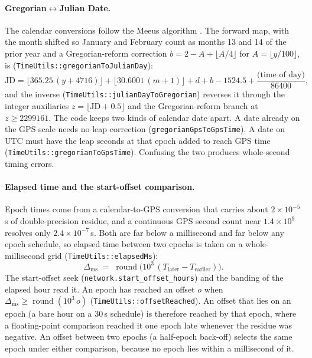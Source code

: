 \documentclass[main.tex]{subfiles}
\begin{document}
\paragraph{Gregorian$\leftrightarrow$Julian Date.}
The calendar conversions follow the Meeus algorithm \cite{meeus1991}.
The forward map, with the month shifted so January and February count as
months 13 and 14 of the prior year and a Gregorian-reform correction
$b = 2 - A + \lfloor A/4\rfloor$ for $A = \lfloor y/100\rfloor$, is
(\texttt{TimeUtils::gregorianToJulianDay}):
\begin{equation}
\mathrm{JD} = \big\lfloor 365.25\,(y+4716)\big\rfloor
            + \big\lfloor 30.6001\,(m+1)\big\rfloor
            + d + b - 1524.5 + \frac{\text{(time of day)}}{86400},
\label{eq:frame-greg2jd}
\end{equation}
and the inverse (\texttt{TimeUtils::julianDayToGregorian}) reverses
it through the integer auxiliaries $z = \lfloor\mathrm{JD}+0.5\rfloor$
and the Gregorian-reform branch at $z \ge 2299161$.  The code keeps two
kinds of calendar date apart.  A date already on the GPS scale needs no
leap correction (\texttt{gregorianGpsToGpsTime}).  A date on UTC must
have the leap seconds at that epoch added to reach GPS time
(\texttt{TimeUtils::gregorianToGpsTime}).  Confusing the two produces
whole-second timing errors.

\paragraph{Elapsed time and the start-offset comparison.}
Epoch times come from a calendar-to-GPS conversion that carries about
$2\times10^{-5}$\,s of double-precision residue, and a continuous GPS
second count near $1.4\times10^{9}$ resolves only $2.4\times10^{-7}$\,s.
Both are far below a millisecond and far below any epoch schedule, so
elapsed time between two epochs is taken on a whole-millisecond grid
(\texttt{TimeUtils::elapsedMs}):
\begin{equation}
\Delta_{\mathrm{ms}} \;=\; \operatorname{round}\!\big(10^{3}\,(T_{\mathrm{later}}-T_{\mathrm{earlier}})\big).
\label{eq:frame-elapsed-ms}
\end{equation}
The start-offset seek (\texttt{network.start\_offset\_hours}) and the
banding of the elapsed hour read it.  An epoch has reached an offset $o$
when $\Delta_{\mathrm{ms}} \ge \operatorname{round}(10^{3}\,o)$
(\texttt{TimeUtils::offsetReached}).  An offset that lies on an epoch (a
bare hour on a 30\,s schedule) is therefore reached by that epoch, where
a floating-point comparison reached it one epoch late whenever the
residue was negative.  An offset between two epochs (a half-epoch
back-off) selects the same epoch under either comparison, because no
epoch lies within a millisecond of it.
\end{document}
